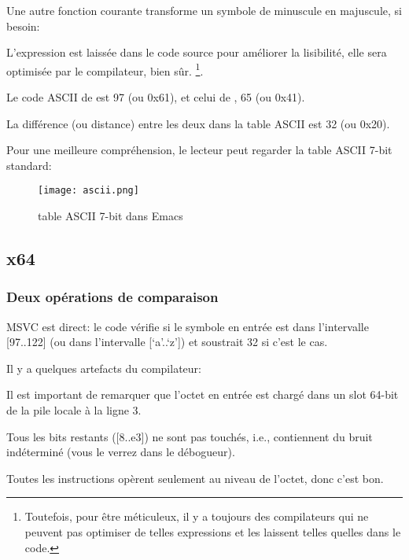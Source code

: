 
Une autre fonction courante transforme un symbole de minuscule en majuscule, si besoin:



L'expression  est laissée dans le code source pour améliorer la lisibilité,
elle sera optimisée par le compilateur, bien sûr.
\footnote{Toutefois, pour être méticuleux, il y a toujours des compilateurs qui ne
peuvent pas optimiser de telles expressions et les laissent telles quelles dans le
code.}.

Le code \ac{ASCII} de  est 97 (ou 0x61), et celui de , 65 (ou 0x41).

La différence (ou distance) entre les deux dans la table \ac{ASCII} est 32 (ou 0x20).

Pour une meilleure compréhension, le lecteur peut regarder la table \ac{ASCII} 7-bit
standard:

\begin{figure}[H]
\centering
\texttt{[image: ascii.png]}
\caption{table \ac{ASCII} 7-bit dans Emacs}
\end{figure}

\subsection{x64}

\subsubsection{Deux opérations de comparaison}

MSVC \NonOptimizing est direct: le code vérifie si le symbole en entrée est dans
l'intervalle [97..122] (ou dans l'intervalle [`a'..`z']) et soustrait 32 si c'est
le cas.

Il y a quelques artefacts du compilateur:



Il est important de remarquer que l'octet en entrée est chargé dans un slot 64-bit
de la pile locale à la ligne 3.

Tous les bits restants ([8..e3]) ne sont pas touchés, i.e., contiennent du bruit indéterminé
(vous le verrez dans le débogueur).

Toutes les instructions opèrent seulement au niveau de l'octet, donc c'est bon.


